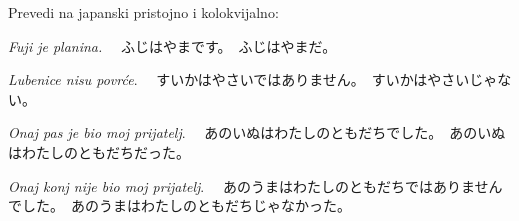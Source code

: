 	\begin{mondai}{\ten Prevedi na japanski pristojno i kolokvijalno:}
		\item \textit{Fuji je planina.} \newline　{ふじはやまです。}　{ふじはやまだ。}
		\item \textit{Lubenice nisu povrće}. \newline　{すいかはやさいではありません。}　{すいかはやさいじゃない。}
		\item \textit{Onaj pas je bio moj prijatelj}. \newline　{あのいぬはわたしのともだちでした。}　{あのいぬはわたしのともだちだった。}
		\item \textit{Onaj konj nije bio moj prijatelj}. \newline　{あのうまはわたしのともだちではありませんでした。}　{あのうまはわたしのともだちじゃなかった。} 
	\end{mondai}

